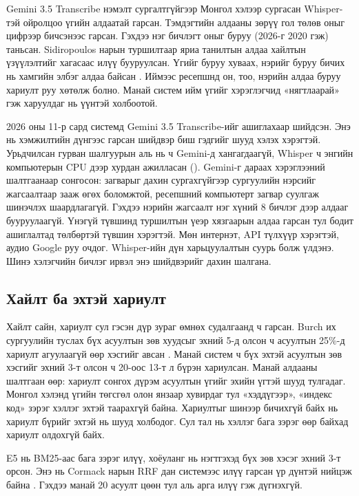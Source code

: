 Gemini 3.5 Transcribe нэмэлт сургалтгүйгээр Монгол хэлээр сургасан Whisper-тэй ойролцоо үгийн алдаатай гарсан. Тэмдэгтийн алдааны зөрүү гол төлөв оныг цифрээр бичсэнээс гарсан. Гэхдээ нэг бичлэгт оныг буруу (2026-г 2020 гэж) таньсан. Sidiropoulos нарын туршилтаар яриа танилтын алдаа хайлтын үзүүлэлтийг хагасаас илүү бууруулсан. Үгийг буруу хуваах, нэрийг буруу бичих нь хамгийн элбэг алдаа байсан \cite{sidiropoulos2022asr}. Иймээс ресепшнд он, тоо, нэрийн алдаа буруу хариулт руу хөтөлж болно. Манай систем ийм үгийг хэрэглэгчид «нягтлаарай» гэж харуулдаг нь үүнтэй холбоотой.

2026 оны 11-р сард системд Gemini 3.5 Transcribe-ийг ашиглахаар шийдсэн. Энэ нь хэмжилтийн дүнгээс гарсан шийдвэр биш гэдгийг шууд хэлэх хэрэгтэй. Урьдчилсан гурван шалгуурын аль нь ч Gemini-д хангагдаагүй, Whisper ч энгийн компьютерын CPU дээр хурдан ажилласан (). Gemini-г дараах хэрэглээний шалтгаанаар сонгосон: загварыг дахин сургахгүйгээр сургуулийн нэрсийг жагсаалтаар зааж өгөх боломжтой, ресепшний компьютерт загвар суулгаж шинэчлэх шаардлагагүй. Гэхдээ нэрийн жагсаалт нэг хүний 8 бичлэг дээр алдааг бууруулаагүй. Үнэгүй түвшинд туршилтын үеэр хязгаарын алдаа гарсан тул бодит ашиглалтад төлбөртэй түвшин хэрэгтэй. Мөн интернэт, API түлхүүр хэрэгтэй, аудио Google руу очдог. Whisper-ийн дүн харьцуулалтын суурь болж үлдэнэ. Шинэ хэлэгчийн бичлэг ирвэл энэ шийдвэрийг дахин шалгана.

\subsection{Хайлт ба эхтэй хариулт}

Хайлт сайн, хариулт сул гэсэн дүр зураг өмнөх судалгаанд ч гарсан. Burch их сургуулийн туслах бүх асуултын зөв хуудсыг эхний 5-д олсон ч асуултын 25\%-д хариулт агуулаагүй өөр хэсгийг авсан \cite{matic2026burch}. Манай систем ч бүх эхтэй асуултын зөв хэсгийг эхний 3-т олсон ч 20-оос 13-т л бүрэн хариулсан. Манай алдааны шалтгаан өөр: хариулт сонгох дүрэм асуултын үгийг эхийн үгтэй шууд тулгадаг. Монгол хэлэнд үгийн төгсгөл олон янзаар хувирдаг тул «хэддүгээр», «индекс код» зэрэг хэллэг эхтэй таарахгүй байна. Хариултыг шинээр бичихгүй байх нь хариулт бүрийг эхтэй нь шууд холбодог. Сул тал нь хэллэг бага зэрэг өөр байхад хариулт олдохгүй байх.

E5 нь BM25-аас бага зэрэг илүү, хоёуланг нь нэгтгэхэд бүх зөв хэсэг эхний 3-т орсон. Энэ нь Cormack нарын RRF дан системээс илүү гарсан үр дүнтэй нийцэж байна \cite{cormack2009rrf}. Гэхдээ манай 20 асуулт цөөн тул аль арга илүү гэж дүгнэхгүй.

